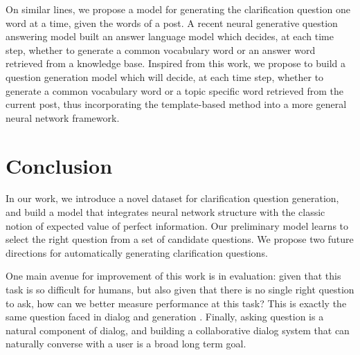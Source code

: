 \documentclass[11pt,a4paper]{article}
\begin{document}
On similar lines, we propose a model for generating the clarification question one word at a time, given the words of a post. A recent neural generative question answering model \cite{yin2016neural} built an answer language model which decides, at each time step, whether to generate a common vocabulary word or an answer word retrieved from a knowledge base. %
Inspired from this work, we propose to build a question generation model which will decide, at each time step, whether to generate a common vocabulary word or a topic specific word retrieved from the current post, thus incorporating the template-based method into a more general neural network framework.

\section{Conclusion}

In our work, we introduce a novel dataset for clarification question generation, and build a model that integrates neural network structure with the classic notion of expected value of perfect information. %
Our preliminary model learns to select the right question from a set of candidate questions. We propose two future directions for automatically generating clarification questions.

One main avenue for improvement of this work is in evaluation: given that this task is so difficult for humans, but also given that there is no single right question to ask, how can we better measure performance at this task? This is exactly the same question faced in dialog and generation \cite{paek2001empirical,lowe2015ubuntu,liu2016not,kannan2017adversarial}. Finally, asking question is a natural component of dialog, and building a collaborative dialog system that can naturally converse with a user is a broad long term goal.



\end{document}
